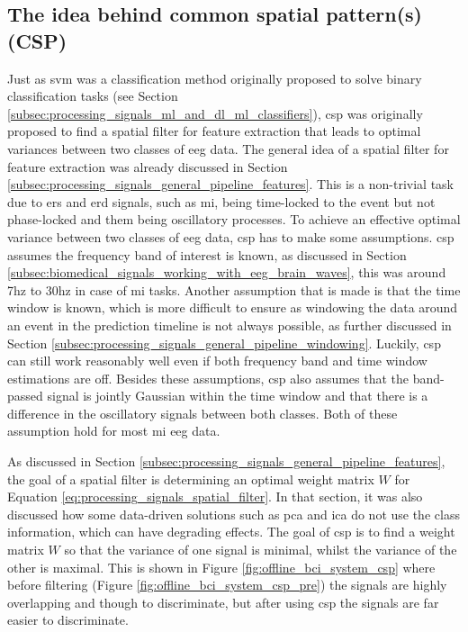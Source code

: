\subsection{The idea behind common spatial pattern(s) (CSP)}
\label{subsec:offline_bci_system_two_step_ml_csp_explained}

Just as \gls{svm} was a classification method originally proposed to solve binary classification tasks (see Section \ref{subsec:processing_signals_ml_and_dl_ml_classifiers}), \gls{csp} was originally proposed to find a spatial filter for feature extraction that leads to optimal variances between two classes of \gls{eeg} data.
The general idea of a spatial filter for feature extraction was already discussed in Section \ref{subsec:processing_signals_general_pipeline_features}.
This is a non-trivial task due to \gls{ers} and \gls{erd} signals, such as \gls{mi}, being time-locked to the event but not phase-locked and them being oscillatory processes.
To achieve an effective optimal variance between two classes of \gls{eeg} data, \gls{csp} has to make some assumptions.
\gls{csp} assumes the frequency band of interest is known, as discussed in Section \ref{subsec:biomedical_signals_working_with_eeg_brain_waves}, this was around 7\gls{hz} to 30\gls{hz} in case of \gls{mi} tasks.
Another assumption that is made is that the time window is known, which is more difficult to ensure as windowing the data around an event in the prediction timeline is not always possible, as further discussed in Section \ref{subsec:processing_signals_general_pipeline_windowing}.
Luckily, \gls{csp} can still work reasonably well even if both frequency band and time window estimations are off.
Besides these assumptions, \gls{csp} also assumes that the band-passed signal is jointly Gaussian within the time window and that there is a difference in the oscillatory signals between both classes.
Both of these assumption hold for most \gls{mi} \gls{eeg} data.

As discussed in Section \ref{subsec:processing_signals_general_pipeline_features}, the goal of a spatial filter is determining an optimal weight matrix $W$ for Equation \ref{eq:processing_signals_spatial_filter}.
In that section, it was also discussed how some data-driven solutions such as \gls{pca} and \gls{ica} do not use the class information, which can have degrading effects.
The goal of \gls{csp} is to find a weight matrix $W$ so that the variance of one signal is minimal, whilst the variance of the other is maximal.
This is shown in Figure \ref{fig:offline_bci_system_csp} where before filtering (Figure \ref{fig:offline_bci_system_csp_pre}) the signals are highly overlapping and though to discriminate, but after using \gls{csp} the signals are far easier to discriminate.

